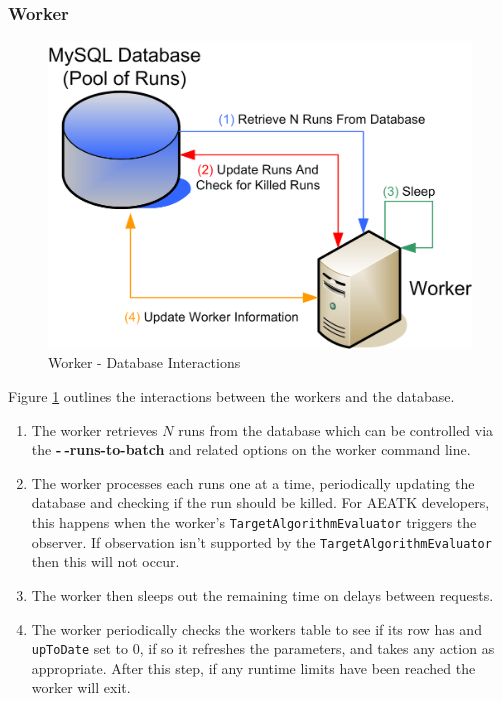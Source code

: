 \documentclass[11pt,letterpaper,oneside]{article}
\begin{document}
\subsubsection{Worker}

\begin{figure}
\centering
\includegraphics[scale=1]{img/Architecture/Worker}
\caption{Worker - Database Interactions}\label{worker}
\end{figure}

Figure \ref{worker} outlines the interactions between the workers and the database. 

\begin{enumerate}
\item The worker retrieves $N$ runs from the database which can be controlled via the \textbf{-$~\!$-runs-to-batch} and related options on the worker command line.
\item The worker processes each runs one at a time, periodically updating the database and checking if the run should be killed. For AEATK developers, this happens when the worker's \texttt{TargetAlgorithmEvaluator} triggers the observer. If observation isn't supported by the \texttt{TargetAlgorithmEvaluator} then this will not occur.
\item The worker then sleeps out the remaining time on delays between requests. 
\item The worker periodically checks the workers table to see if its row has and \texttt{upToDate} set to 0, if so it refreshes the parameters, and takes any action as appropriate. After this step, if any runtime limits have been reached the worker will exit.
\end{enumerate}
\end{document}
